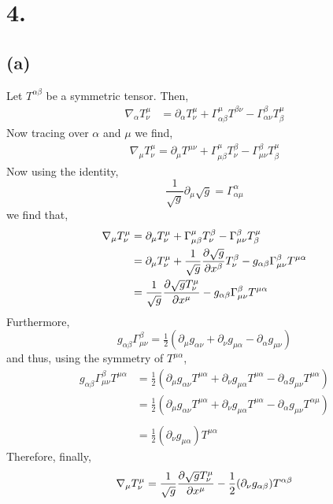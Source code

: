\documentclass[12pt]{article}
\begin{document}
\section*{4.}

\subsection*{(a)}

Let $T^{\alpha \beta}$ be a symmetric tensor. Then,
\begin{align*}
\nabla_\alpha T^{\mu}_{\nu} & = \partial_\alpha T^{\mu}_{\nu} + \Gamma_{\alpha \beta}^\mu T^{\beta \nu} - \Gamma^\beta_{\alpha \nu} T^{\mu}_{\beta} 
\end{align*}
Now tracing over $\alpha$ and $\mu$ we find,
\begin{align*}
\nabla_\mu T^{\mu}_{\nu} = \partial_\mu T^{\mu \nu} + \Gamma^\mu_{\mu \beta} T^{\beta}_{\nu} - \Gamma^\beta_{\mu \nu} T^{\mu}_{\beta} 
\end{align*}
Now using the identity,
\[ \frac{1}{\sqrt{g}} \partial_\mu \sqrt{g} = \Gamma^\alpha_{\alpha \mu} \]
we find that,
\begin{align*}
\nabla_\mu T^{\mu}_{\nu}  & = \partial_\mu T^{\mu}_{\nu} + \Gamma^\mu_{\mu \beta} T^{\beta}_{\nu} - \Gamma^\beta_{\mu \nu} T^{\mu}_{\beta} 
\\
& = \partial_\mu T^{\mu}_{\nu}  + \frac{1}{\sqrt{g}} \frac{\partial{\sqrt{g}}}{\partial{x^\beta}} T^{\beta}_{\nu} - g_{\alpha \beta} \Gamma^\beta_{\mu \nu} T^{\mu \alpha} 
\\
& = \frac{1}{\sqrt{g}} \frac{\partial{\sqrt{g} T^{\mu}_{\nu}}}{\partial{x^\mu}} - g_{\alpha \beta} \Gamma^\beta_{\mu \nu} T^{\mu \alpha} 
\end{align*}
Furthermore,
\[ g_{\alpha \beta} \Gamma^\beta_{\mu \nu} = \tfrac{1}{2} \left( \partial_\mu g_{\alpha \nu} + \partial_\nu g_{\mu \alpha} - \partial_\alpha g_{\mu \nu} \right) \]
and thus, using the symmetry of $T^{\mu \alpha}$,
\begin{align*}
g_{\alpha \beta} \Gamma^\beta_{\mu \nu} T^{\mu \alpha} & = \tfrac{1}{2} \left( \partial_\mu g_{\alpha \nu} T^{\mu \alpha} + \partial_\nu g_{\mu \alpha} T^{\mu \alpha} - \partial_\alpha g_{\mu \nu} T^{\mu \alpha} \right)
\\
& = \tfrac{1}{2} \left( \partial_\mu g_{\alpha \nu} T^{\mu \alpha} + \partial_\nu g_{\mu \alpha} T^{\mu \alpha} - \partial_\alpha g_{\mu \nu} T^{\alpha \mu} \right)
\\
\\
& = \tfrac{1}{2}  (\partial_\nu g_{\mu \alpha}) T^{\mu \alpha}
\end{align*}
Therefore, finally,
\[ \nabla_\mu T^{\mu}_{\nu} = \frac{1}{\sqrt{g}} \frac{\partial{\sqrt{g} T^{\mu}_{\nu}}}{\partial{x^\mu}} - \frac{1}{2} (\partial_\nu g_{\alpha \beta}) T^{\alpha \beta} \]
\end{document}
